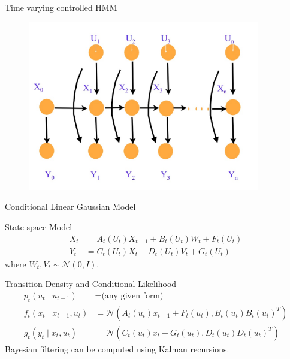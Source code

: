 \documentclass[handout]{beamer}
\begin{document}
\begin{frame}{Time varying controlled HMM}
  \begin{figure}
    \centering
    \includegraphics[width = 0.9\textwidth]{figures/hmm.jpg}
  \end{figure}
\end{frame}

\begin{frame}{Conditional Linear Gaussian Model}
\begin{block}{State-space Model}
\begin{align*}
  X_t &= A_t(U_t)X_{t-1} + B_t(U_t)W_t + F_t(U_t) \nonumber \\
  Y_t &= C_t(U_t)X_t + D_t(U_t)V_t + G_t(U_t)
\label{eq:model}
\end{align*}
where $W_t, V_t \sim \mathcal{N}(0,I)$.
\end{block}
\begin{block}{Transition Density and Conditional Likelihood}
\begin{align*}  p_t(u_t \mid u_{t-1}) &= \textrm{(any given form)} \nonumber \\
  f_t(x_t \mid x_{t-1}, u_t) &= \mathcal{N}(A_t(u_t) x_{t-1} + F_t(u_t), B_t(u_t)B_t(u_t)^T) \nonumber \\
  g_t(y_t \mid x_t, u_t)    &= \mathcal{N}(C_t(u_t) x_t + G_t(u_t), D_t(u_t)D_t(u_t)^T)
\end{align*}
Bayesian filtering can be computed using Kalman recursions.
\end{block}
\end{frame}
\end{document}
